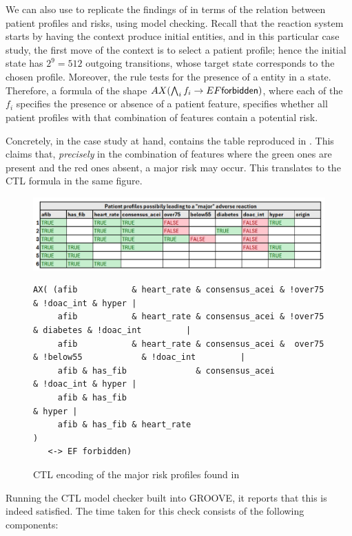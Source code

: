 \medskip\noindent We can also use \GROOVE to replicate the findings of  \cite[Fig.\ 6]{DBLP:conf/cmsb/BowlesBBFGM24} in terms of the relation between patient profiles and risks, using model checking. Recall that the reaction system starts by having the context produce initial entities, and in this particular case study, the first move of the context is to select a patient profile; hence the initial state has $2^9=512$ outgoing transitions, whose target state corresponds to the chosen profile. Moreover, the rule \forbidden tests for the presence of a \Forbidden entity in a state. Therefore, a formula of the shape
$AX(\bigwedge_i f_i \rightarrow EF {\text{\sffamily forbidden}})$, where each of the $f_i$ specifies the presence or absence of a patient feature, specifies whether all patient profiles with that combination of features contain a potential risk.

Concretely, in the case study at hand, \cite[Fig.~6]{DBLP:conf/cmsb/BowlesBBFGM24} contains the table reproduced in . This claims that, \emph{precisely} in the combination of features where the green ones are present and the red ones absent, a major risk may occur. This translates to the CTL formula in the same figure.
%
\begin{figure}
\centering
\includegraphics[scale=.4]{./figs/table-from-cmsb2024}\begin{lstlisting}[basicstyle=\ttfamily\small,xleftmargin=0cm]
AX( (afib           & heart_rate & consensus_acei & !over75                       & !doac_int & hyper |
     afib           & heart_rate & consensus_acei & !over75            & diabetes & !doac_int         |
     afib           & heart_rate & consensus_acei &  over75 & !below55            & !doac_int         |
     afib & has_fib              & consensus_acei                                 & !doac_int & hyper |
     afib & has_fib                                                                           & hyper |
     afib & has_fib & heart_rate                                                                      )
   <-> EF forbidden)
\end{lstlisting}
\caption{CTL encoding of the major risk profiles found in \cite[Fig.~6]{DBLP:conf/cmsb/BowlesBBFGM24}}
\label{fig:table-from-cmsb2024}
\end{figure}
%
Running the CTL model checker built into GROOVE, it reports that this is indeed satisfied. The time taken for this check consists of the following components:

